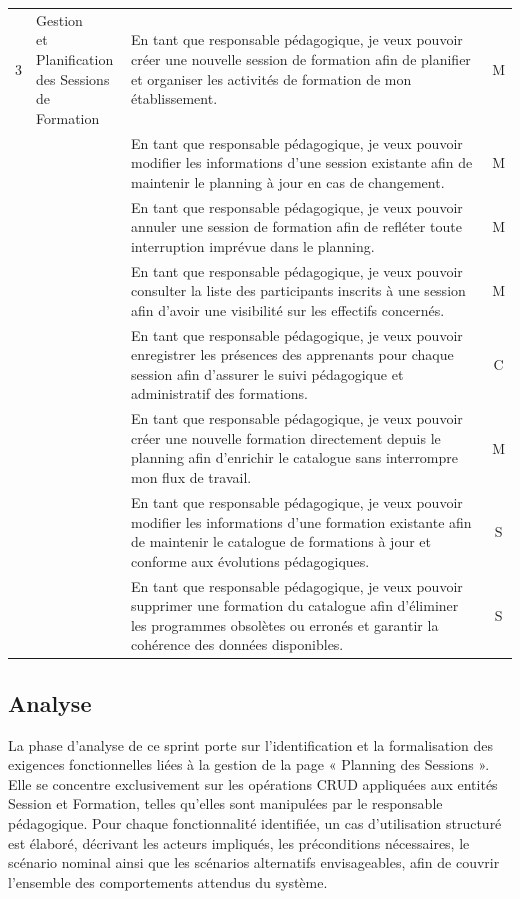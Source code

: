 {\begin{longtable}{|c|p{3.5cm}|p{8.5cm}|c|}
3 & \makecell[l]{Gestion\\et Planification\\des Sessions de\\Formation}
& En tant que responsable pédagogique, je veux pouvoir créer une nouvelle session de formation afin de planifier et organiser les activités de formation de mon établissement. & M \\
\cline{3-4}
& & En tant que responsable pédagogique, je veux pouvoir modifier les informations d'une session existante afin de maintenir le planning à jour en cas de changement. & M \\
\cline{3-4}
& & En tant que responsable pédagogique, je veux pouvoir annuler une session de formation afin de refléter toute interruption imprévue dans le planning. & M \\
\hline
& & En tant que responsable pédagogique, je veux pouvoir consulter la liste des participants inscrits à une session afin d'avoir une visibilité sur les effectifs concernés. & M \\
\cline{3-4}
& & En tant que responsable pédagogique, je veux pouvoir enregistrer les présences des apprenants pour chaque session afin d'assurer le suivi pédagogique et administratif des formations. & C \\
\cline{3-4}
& & En tant que responsable pédagogique, je veux pouvoir créer une nouvelle formation directement depuis le planning afin d'enrichir le catalogue sans interrompre mon flux de travail. & M \\
\cline{3-4}
& & En tant que responsable pédagogique, je veux pouvoir modifier les informations d'une formation existante afin de maintenir le catalogue de formations à jour et conforme aux évolutions pédagogiques. & S \\
\cline{3-4}
& & En tant que responsable pédagogique, je veux pouvoir supprimer une formation du catalogue afin d'éliminer les programmes obsolètes ou erronés et garantir la cohérence des données disponibles. & S \\
\hline
\end{longtable}
}

\subsection{Analyse}

La phase d'analyse de ce sprint porte sur l'identification et la formalisation des exigences fonctionnelles liées à la gestion de la page « Planning des Sessions ». Elle se concentre exclusivement sur les opérations CRUD appliquées aux entités Session et Formation, telles qu'elles sont manipulées par le responsable pédagogique. Pour chaque fonctionnalité identifiée, un cas d'utilisation structuré est élaboré, décrivant les acteurs impliqués, les préconditions nécessaires, le scénario nominal ainsi que les scénarios alternatifs envisageables, afin de couvrir l'ensemble des comportements attendus du système.
\vspace{0.3cm}

